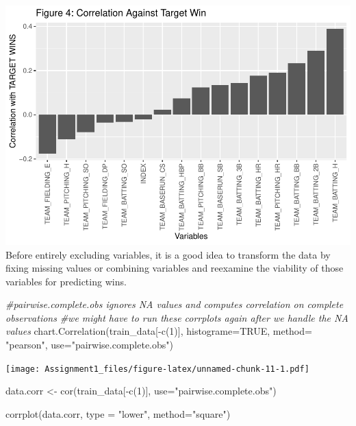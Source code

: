 \documentclass[
]{article}
\newenvironment{Shaded}{\begin{snugshade}}{\end{snugshade}}
\newcommand{\AttributeTok}[1]{\textcolor[rgb]{0.77,0.63,0.00}{#1}}
\newcommand{\CommentTok}[1]{\textcolor[rgb]{0.56,0.35,0.01}{\textit{#1}}}
\newcommand{\ConstantTok}[1]{\textcolor[rgb]{0.00,0.00,0.00}{#1}}
\newcommand{\DecValTok}[1]{\textcolor[rgb]{0.00,0.00,0.81}{#1}}
\newcommand{\FunctionTok}[1]{\textcolor[rgb]{0.00,0.00,0.00}{#1}}
\newcommand{\NormalTok}[1]{#1}
\newcommand{\OtherTok}[1]{\textcolor[rgb]{0.56,0.35,0.01}{#1}}
\newcommand{\SpecialCharTok}[1]{\textcolor[rgb]{0.00,0.00,0.00}{#1}}
\newcommand{\StringTok}[1]{\textcolor[rgb]{0.31,0.60,0.02}{#1}}
\begin{document}
\includegraphics{Assignment1_files/figure-latex/unnamed-chunk-10-1.pdf}
Before entirely excluding variables, it is a good idea to transform the
data by fixing missing values or combining variables and reexamine the
viability of those variables for predicting wins.

\begin{Shaded}
\begin{Highlighting}[]
\CommentTok{\#pairwise.complete.obs ignores NA values and computes correlation on complete observations}
\CommentTok{\#we might have to run these corrplots again after we handle the NA values}
\FunctionTok{chart.Correlation}\NormalTok{(train\_data[}\SpecialCharTok{{-}}\FunctionTok{c}\NormalTok{(}\DecValTok{1}\NormalTok{)], }\AttributeTok{histograme=}\ConstantTok{TRUE}\NormalTok{, }\AttributeTok{method=} \StringTok{"pearson"}\NormalTok{, }\AttributeTok{use=}\StringTok{"pairwise.complete.obs"}\NormalTok{)}
\end{Highlighting}
\end{Shaded}

\texttt{[image: Assignment1\_files/figure-latex/unnamed-chunk-11-1.pdf]}

\begin{Shaded}
\begin{Highlighting}[]
\NormalTok{data.corr }\OtherTok{\textless{}{-}} \FunctionTok{cor}\NormalTok{(train\_data[}\SpecialCharTok{{-}}\FunctionTok{c}\NormalTok{(}\DecValTok{1}\NormalTok{)], }\AttributeTok{use=}\StringTok{"pairwise.complete.obs"}\NormalTok{)}

\FunctionTok{corrplot}\NormalTok{(data.corr, }\AttributeTok{type =} \StringTok{"lower"}\NormalTok{, }\AttributeTok{method=}\StringTok{"square"}\NormalTok{)}
\end{Highlighting}
\end{Shaded}
\end{document}
